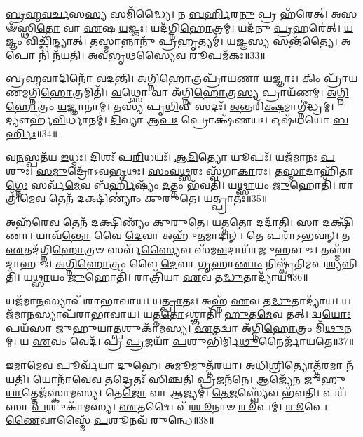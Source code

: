 \-\ul{𑌬𑍍𑌰}\-\-\ul{𑌹𑍍𑌮}\-\-\ul{𑌵}\-\-\ul{𑌰𑍍𑌚}\-𑌸\-\ul{𑌸𑍍𑌯} 𑌸𑌮𑌿᳴𑌦𑍍𑌧𑍍𑌯𑍈।
𑌨 \ul{𑌬}\-\-\ul{𑌰𑍍}\-𑌹𑌿𑌰\-\ul{𑌨𑍁}\- 𑌪𑍍𑌰 𑌹᳴𑌰𑍇𑌤𑍍।
𑌅𑌸𑍟᳴𑌸𑍍𑌥𑌿\-\ul{𑌤𑍋} 𑌵𑌾 \ul{𑌏}\-𑌷 \ul{𑌯}\-𑌜𑍍𑌞𑌃।
𑌯𑌦᳴𑌗𑍍𑌨𑌿\-\ul{𑌹𑍋}\-𑌤𑍍𑌰𑌮𑍍।
𑌯𑌦᳴𑌨𑍁 \ul{𑌪𑍍𑌰}\-𑌹𑌰𑍇॑𑌤𑍍।
\-\ul{𑌯}\-𑌜𑍍𑌞𑌂 𑌵𑌿𑌚𑍍𑌛𑌿᳴𑌨𑍍𑌦𑍍𑌯𑌾𑌤𑍍।
𑌤\-\ul{𑌸𑍍𑌮𑌾}\-𑌨𑍍𑌨𑌾𑌨𑍁᳴ \ul{𑌪𑍍𑌰}\-𑌹𑍃𑌤𑍍𑌯𑌮𑍍॑।
\-\ul{𑌯}\-𑌜𑍍𑌞\-\ul{𑌸𑍍𑌯} 𑌸𑌨𑍍𑌤᳴𑌤𑍍𑌯𑍈।
\-\ul{𑌅}\-𑌪𑍋 𑌨𑌿 𑌨᳴𑌯𑌤𑌿।
\-\ul{𑌅}\-\-\ul{𑌵}\-\-\ul{𑌭𑍃}\-𑌥\-\ul{𑌸𑍍𑌯𑍈}\-𑌵 \ul{𑌰𑍂}\-𑌪𑌮᳴𑌕𑌃॥33॥\anuvakamend[\-\ul{𑌅}\-\-\ul{𑌭}\-\-\ul{𑌵}\-\-\ul{𑌨𑍍𑌭}\-\-\ul{𑌵}\-\-\ul{𑌤𑌿} \ul{𑌜𑍁}\-\-\ul{𑌹𑍁}\-𑌯𑌾𑌨𑍍𑌨᳴𑌯𑌤𑌿 𑌮𑌾\-\ul{𑌰𑍍𑌷𑍍𑌟𑌿} 𑌦𑍍𑌵𑌿𑌃 𑌪𑍍𑌰𑌾𑌶𑍍𑌞𑌾᳴𑌤𑌿 𑌪𑍍𑌰𑌾𑌜𑌾\-\ul{𑌪}\-𑌤𑍍𑌯𑌮𑌾𑌚𑌾᳴𑌮𑌤𑍀𑌨𑍍𑌧𑍇\-𑌽𑌕𑌃]

\-\ul{𑌬𑍍𑌰}\-\-\ul{𑌹𑍍𑌮}\-\-\ul{𑌵𑌾}\-𑌦𑌿𑌨𑍋᳴ 𑌵𑌦𑌨𑍍𑌤𑌿।
\-\ul{𑌅}\-\-\ul{𑌗𑍍𑌨𑌿}\-\-\ul{𑌹𑍋}\-𑌤𑍍𑌰𑌪𑍍𑌰𑌾᳴𑌯𑌣𑌾 \ul{𑌯}\-𑌜𑍍𑌞𑌾𑌃।
𑌕𑌿𑌂 𑌪𑍍𑌰𑌾᳴𑌯𑌣𑌮𑌗𑍍𑌨𑌿\-\ul{𑌹𑍋}\-𑌤𑍍𑌰𑌮𑌿𑌤𑌿᳴।
\-\ul{𑌵}\-𑌥𑍍𑌸𑍋 𑌵𑌾 𑌅᳴𑌗𑍍𑌨𑌿\-\ul{𑌹𑍋}\-𑌤𑍍𑌰\-\ul{𑌸𑍍𑌯} 𑌪𑍍𑌰𑌾𑌯᳴𑌣𑌮𑍍।
\-\ul{𑌅}\-\-\ul{𑌗𑍍𑌨𑌿}\-\-\ul{𑌹𑍋}\-𑌤𑍍𑌰𑌂 \ul{𑌯}\-𑌜𑍍𑌞𑌾𑌨𑌾॑𑌮𑍍।
𑌤𑌸𑍍𑌯᳴ 𑌪𑍃\-\ul{𑌥𑌿}\-𑌵𑍀 𑌸𑌦𑌃᳴।
\-\ul{𑌅}\-𑌨𑍍𑌤𑌰𑌿᳴\-\ul{𑌕𑍍𑌷}\-𑌮𑌾𑌗𑍍𑌨𑍀॑𑌦𑍍𑌧𑍍𑌰𑌮𑍍।
𑌦𑍍𑌯𑍗𑌰𑍍\mbox{}𑌹᳴\-\ul{𑌵𑌿}\-𑌰𑍍𑌧𑌾𑌨𑌮𑍍॑।
\-\ul{𑌦𑌿}\-𑌵𑍍𑌯𑌾 𑌆\-\ul{𑌪𑌃} 𑌪𑍍𑌰𑍋𑌕𑍍𑌷᳴𑌣𑌯𑌃।
𑌓𑌷᳴𑌧𑌯𑍋 \ul{𑌬}\-\-\ul{𑌰𑍍}\-𑌹𑌿𑌃॥34॥

𑌵\-\ul{𑌨}\-𑌸𑍍𑌪𑌤᳴𑌯 \ul{𑌇}\-𑌧𑍍𑌮𑌃।
𑌦𑌿𑌶𑌃᳴ 𑌪\-\ul{𑌰𑌿}\-𑌧𑌯𑌃᳴।
\-\ul{𑌆}\-\-\ul{𑌦𑌿}\-𑌤𑍍𑌯𑍋 𑌯𑍂𑌪𑌃᳴।
𑌯𑌜᳴𑌮𑌾𑌨𑌃 \ul{𑌪}\-𑌶𑍁𑌃।
\-\ul{𑌸}\-\-\ul{𑌮𑍁}\-𑌦𑍍𑌰𑍋᳴\-𑌽𑌵\-\ul{𑌭𑍃}\-𑌥𑌃।
\-\ul{𑌸𑌂}\-\-\ul{𑌵}\-\-\ul{𑌥𑍍𑌸}\-𑌰𑌃 𑌸𑍍𑌵᳴𑌗𑌾\-\ul{𑌕𑌾}\-𑌰𑌃।
𑌤\-\ul{𑌸𑍍𑌮𑌾}\-𑌦𑌾𑌹𑌿᳴𑌤𑌾\-\ul{𑌗𑍍𑌨𑍇𑌃} 𑌸𑌰𑍍𑌵᳴\-\ul{𑌮𑍇}\-𑌵 𑌬᳴\-\ul{𑌰𑍍𑌹𑌿}\-𑌷𑍍𑌯𑌂᳴ \ul{𑌦}\-𑌤𑍍𑌤𑌂 𑌭᳴𑌵𑌤𑌿।
𑌯\-\ul{𑌥𑍍𑌸𑌾}\-𑌯𑌂 \ul{𑌜𑍁}\-𑌹𑍋𑌤𑌿᳴।
𑌰𑌾𑌤𑍍𑌰𑌿᳴\-\ul{𑌮𑍇}\-𑌵 𑌤𑍇𑌨᳴ 𑌦\-\ul{𑌕𑍍𑌷𑌿}\-𑌣𑍍𑌯𑌾𑌂॑ 𑌕𑍁𑌰𑍁𑌤𑍇।
𑌯\-\ul{𑌤𑍍𑌪𑍍𑌰𑌾}\-𑌤𑌃॥35॥

𑌅𑌹᳴\-\ul{𑌰𑍇}\-𑌵 𑌤𑍇𑌨᳴ 𑌦\-\ul{𑌕𑍍𑌷𑌿}\-𑌣𑍍𑌯𑌂᳴ 𑌕𑍁𑌰𑍁𑌤𑍇।
𑌯𑌤𑍍𑌤\-\ul{𑌤𑍋} 𑌦𑌦𑌾᳴𑌤𑌿।
𑌸𑌾 𑌦𑌕𑍍𑌷𑌿᳴𑌣𑌾।
𑌯𑌾𑌵᳴\-\ul{𑌨𑍍𑌤𑍋} 𑌵𑍈 \ul{𑌦𑍇}\-𑌵𑌾 𑌅𑌹𑍁᳴\-\ul{𑌤}\-𑌮𑌾𑌦𑌨𑍍।
𑌤𑍇 𑌪𑌰𑌾᳴\-𑌽𑌭𑌵𑌨𑍍।
𑌤 \ul{𑌏}\-𑌤𑌦᳴𑌗𑍍𑌨𑌿\-\ul{𑌹𑍋}\-𑌤𑍍𑌰𑍞 𑌸𑌰𑍍𑌵᳴\-\ul{𑌸𑍍𑌯𑍈}\-𑌵 𑌸᳴𑌮\-\ul{𑌵}\-𑌦𑌾𑌯𑌾᳴𑌜𑍁𑌹𑌵𑍁𑌃।
𑌤𑌸𑍍𑌮𑌾᳴𑌦𑌾𑌹𑍁𑌃।
\-\ul{𑌅}\-\-\ul{𑌗𑍍𑌨𑌿}\-\-\ul{𑌹𑍋}\-𑌤𑍍𑌰𑌂 𑌵𑍈 \ul{𑌦𑍇}\-𑌵𑌾 \ul{𑌗𑍃}\-𑌹𑌾\-\ul{𑌣𑌾𑌂} 𑌨𑌿𑌷𑍍𑌕𑍃᳴𑌤𑌿𑌮𑌪\-\ul{𑌶𑍍𑌯}\-𑌨𑍍𑌨𑌿𑌤𑌿᳴।
𑌯\-\ul{𑌥𑍍𑌸𑌾}\-𑌯𑌂 \ul{𑌜𑍁}\-𑌹𑍋𑌤𑌿᳴।
𑌰𑌾𑌤𑍍𑌰𑌿᳴𑌯𑌾 \ul{𑌏}\-𑌵 𑌤\-\ul{𑌦𑍍𑌧𑍁}\-𑌤𑌾𑌦𑍍𑌯𑌾᳴𑌯॥36॥

𑌯𑌜᳴𑌮𑌾\-\ul{𑌨}\-𑌸𑍍𑌯𑌾𑌪᳴𑌰𑌾\-𑌭𑌾𑌵𑌾𑌯।
𑌯\-\ul{𑌤𑍍𑌪𑍍𑌰𑌾}\-𑌤𑌃।
𑌅𑌹𑍍𑌨᳴ \ul{𑌏}\-𑌵 𑌤\-\ul{𑌦𑍍𑌧𑍁}\-𑌤𑌾𑌦𑍍𑌯𑌾᳴𑌯।
𑌯𑌜᳴𑌮𑌾\-\ul{𑌨}\-𑌸𑍍𑌯𑌾𑌪᳴𑌰𑌾𑌭𑌾𑌵𑌾𑌯।
𑌯𑌤𑍍𑌤\-\ul{𑌤𑍋}\-\-𑌽𑌶𑍍𑌞𑌾𑌤𑌿᳴।
\-\ul{𑌹𑍁}\-𑌤\-\ul{𑌮𑍇}\-𑌵 𑌤𑌤𑍍।
𑌦𑍍𑌵\-\ul{𑌯𑍋𑌃} 𑌪𑌯᳴𑌸𑌾 𑌜𑍁𑌹𑍁𑌯𑌾\-\ul{𑌤𑍍𑌪}\-𑌶𑍁𑌕𑌾᳴𑌮𑌸𑍍𑌯।
\-\ul{𑌏}\-𑌤𑌦𑍍𑌵𑌾 𑌅᳴𑌗𑍍𑌨𑌿\-\ul{𑌹𑍋}\-𑌤𑍍𑌰𑌂 𑌮𑌿᳴\-\ul{𑌥𑍁}\-𑌨𑌮𑍍।
𑌯 \ul{𑌏}\-𑌵𑌂 𑌵𑍇𑌦᳴।
𑌪𑍍𑌰 \ul{𑌪𑍍𑌰}\-𑌜𑌯𑌾᳴ \ul{𑌪}\-𑌶𑍁𑌭𑌿᳴𑌰𑍍𑌮𑌿\-\ul{𑌥𑍁}\-𑌨𑍈𑌰𑍍𑌜𑌾᳴𑌯𑌤𑍇॥37॥

\-\ul{𑌇}\-𑌮𑌾\-\ul{𑌮𑍇}\-𑌵 𑌪𑍂𑌰𑍍𑌵᳴𑌯𑌾 \ul{𑌦𑍁}\-𑌹𑍇।
\-\ul{𑌅}\-𑌮𑍂𑌮𑍁𑌤𑍍𑌤᳴𑌰𑌯𑌾।
\-\ul{𑌅}\-\-\ul{𑌧𑌿}\-𑌶𑍍𑌰𑌿𑌤𑍍𑌯𑍋𑌤𑍍𑌤᳴\-\ul{𑌰}\-𑌮𑌾 𑌨᳴𑌯𑌤𑌿।
𑌯𑍋𑌨𑌾᳴\-\ul{𑌵𑍇}\-𑌵 𑌤𑌦𑍍𑌰𑍇𑌤𑌃᳴ 𑌸𑌿𑌞𑍍𑌚𑌤𑌿 \ul{𑌪𑍍𑌰}\-𑌜𑌨᳴𑌨𑍇।
𑌆𑌜𑍍𑌯𑍇᳴𑌨 𑌜𑍁𑌹𑍁\-\ul{𑌯𑌾}\-𑌤𑍍𑌤𑍇𑌜᳴𑌸𑍍𑌕𑌾𑌮𑌸𑍍𑌯।
𑌤𑍇\-\ul{𑌜𑍋} 𑌵𑌾 𑌆𑌜𑍍𑌯𑌮𑍍॑।
\-\ul{𑌤𑍇}\-\-\ul{𑌜}\-𑌸𑍍𑌵𑍍𑌯𑍇᳴𑌵 𑌭᳴𑌵𑌤𑌿।
𑌪𑌯᳴𑌸𑌾 \ul{𑌪}\-𑌶𑍁𑌕𑌾᳴𑌮𑌸𑍍𑌯।
\-\ul{𑌏}\-𑌤𑌦𑍍𑌵𑍈 𑌪᳴\-\ul{𑌶𑍂}\-𑌨𑌾𑍞 \ul{𑌰𑍂}\-𑌪𑌮𑍍।
\-\ul{𑌰𑍂}\-𑌪𑍇\-\ul{𑌣𑍈}\-𑌵𑌾𑌸𑍍𑌮𑍈᳴ \ul{𑌪}\-𑌶𑍂𑌨𑌵᳴ 𑌰𑍁𑌨𑍍𑌧𑍇॥38॥


